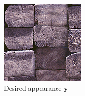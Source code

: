 \begin{figure}[]
\begin{subfigure}{\textwidth}
\begin{subfigure}{0.19\textwidth}
        \end{subfigure}

        \begin{subfigure}{0.19\textwidth}
            \centering
            \includegraphics[width=\textwidth]{images/04-experiment03/staircase_beams_target.jpg}
            \caption*{Desired appearance \(\bm{y}\)}
            \vspace*{5mm}
        \end{subfigure}
        \hfill
        \begin{subfigure}{0.19\textwidth}
            \centering
            \begin{tikzpicture}

\end{tikzpicture}
\end{subfigure}
\end{subfigure}
\end{figure}
